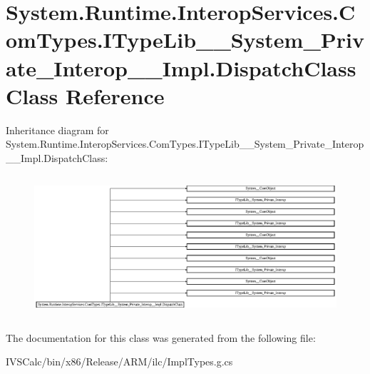\hypertarget{class_system_1_1_runtime_1_1_interop_services_1_1_com_types_1_1_i_type_lib_____system___private_6963c98ee15ae70228ad9cf5ea92fea6}{}\section{System.\+Runtime.\+Interop\+Services.\+Com\+Types.\+I\+Type\+Lib\+\_\+\+\_\+\+System\+\_\+\+Private\+\_\+\+Interop\+\_\+\+\_\+\+Impl.\+Dispatch\+Class Class Reference}
\label{class_system_1_1_runtime_1_1_interop_services_1_1_com_types_1_1_i_type_lib_____system___private_6963c98ee15ae70228ad9cf5ea92fea6}
Inheritance diagram for System.\+Runtime.\+Interop\+Services.\+Com\+Types.\+I\+Type\+Lib\+\_\+\+\_\+\+System\+\_\+\+Private\+\_\+\+Interop\+\_\+\+\_\+\+Impl.\+Dispatch\+Class\+:\begin{figure}[H]
\begin{center}
\leavevmode
\includegraphics[height=5.283019cm]{class_system_1_1_runtime_1_1_interop_services_1_1_com_types_1_1_i_type_lib_____system___private_6963c98ee15ae70228ad9cf5ea92fea6}
\end{center}
\end{figure}


The documentation for this class was generated from the following file\+:\begin{DoxyCompactItemize}
\item 
I\+V\+S\+Calc/bin/x86/\+Release/\+A\+R\+M/ilc/Impl\+Types.\+g.\+cs\end{DoxyCompactItemize}
